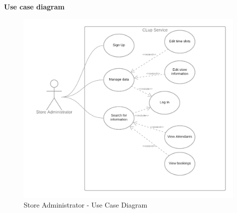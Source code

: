 \documentclass[table, 12pt]{article}
\begin{document}
\begin{minipage}{\textwidth}
    \textbf{Use case diagram}
    \begin{figure}[H]
        \begin{center}
            \includegraphics[width=\textwidth]{assets/use_case_diagram_store_manager.png}
            \caption{Store Administrator - Use Case Diagram}
        \end{center}
    \end{figure}
\end{minipage}
\end{document}
